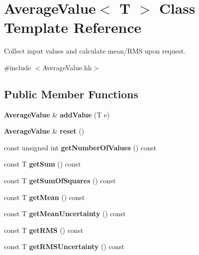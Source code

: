 \section{AverageValue$<$ T $>$ Class Template Reference}
\label{classAverageValue}


Collect input values and calculate mean/RMS upon request.  


{\ttfamily \#include $<$AverageValue.hh$>$}\subsection*{Public Member Functions}
\begin{DoxyCompactItemize}
\item 
{\bf AverageValue} \& {\bfseries addValue} (T e)\label{classAverageValue_a761e96e88901b8660ed3144e62111d1e}

\item 
{\bf AverageValue} \& {\bfseries reset} ()\label{classAverageValue_a8402a0c0c5684e70ab5b2f01d316d695}

\item 
const unsigned int {\bfseries getNumberOfValues} () const \label{classAverageValue_a8ec1cb0f2a04a199f8993025859573e1}

\item 
const T {\bfseries getSum} () const \label{classAverageValue_a7b92383c27eb1897f0fa4ab9b48dc7d6}

\item 
const T {\bfseries getSumOfSquares} () const \label{classAverageValue_a085cb76103bddc0030d95d704f5913b1}

\item 
const T {\bfseries getMean} () const \label{classAverageValue_af500336a4650b1ee612e39dfa06687e4}

\item 
const T {\bfseries getMeanUncertainty} () const \label{classAverageValue_a0dd1de27ea460d4c77f807e95b554589}

\item 
const T {\bfseries getRMS} () const \label{classAverageValue_a463d2278f5223cae4c2d4aafbbbbd390}

\item 
const T {\bfseries getRMSUncertainty} () const \label{classAverageValue_a746c0c5ca150856c7f0a3b4dbe0e9906}

\end{DoxyCompactItemize}
